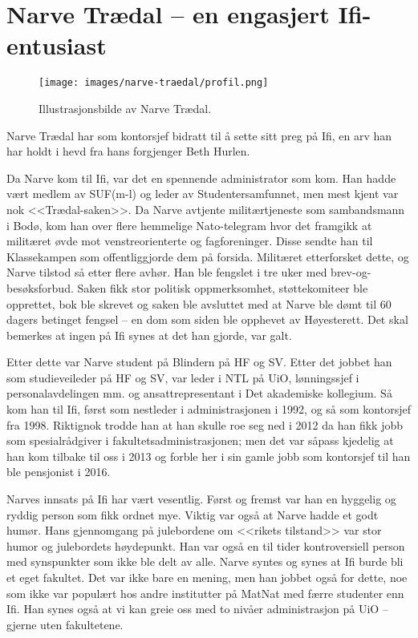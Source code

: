 \chapter[Narve Trædal]{Narve Trædal -- en engasjert Ifi-entusiast}

\author{Skrevet av Dag Langmyhr og Arne Maus}

\begin{wrapfigure}{r}{5cm}
	\centering
	\texttt{[image: images/narve-traedal/profil.png]}
	\label{fig:narve-traedal}
	\caption{Illustrasjonsbilde av Narve Trædal.}
\end{wrapfigure}

Narve Trædal har som kontorsjef bidratt til å sette sitt preg på Ifi, en arv han har holdt i hevd fra hans forgjenger Beth Hurlen.

Da Narve kom til Ifi, var det en spennende administrator som kom. Han hadde vært medlem av SUF(m-l) og leder av Studentersamfunnet, men mest kjent var nok <<Trædal-saken>>. Da Narve avtjente militærtjeneste som sambandsmann i Bodø, kom han over flere hemmelige Nato-telegram hvor det framgikk at militæret øvde mot venstreorienterte og fagforeninger. Disse sendte han til Klassekampen som offentliggjorde dem på forsida. Militæret etterforsket dette, og Narve tilstod så etter flere avhør. Han ble fengslet i tre uker med brev-og-besøksforbud. Saken fikk stor politisk oppmerksomhet, støttekomiteer ble opprettet, bok ble skrevet og saken ble avsluttet med at Narve ble dømt til 60 dagers betinget fengsel – en dom som siden ble opphevet av Høyesterett. Det skal bemerkes at ingen på Ifi synes at det han gjorde, var galt.

Etter dette var Narve student på Blindern på HF og SV. Etter det jobbet han som studieveileder på HF og SV, var leder i NTL på UiO, lønningssjef i personalavdelingen mm. og ansattrepresentant i Det akademiske kollegium. Så kom han til Ifi, først som nestleder i administrasjonen i 1992, og så som kontorsjef fra 1998. Riktignok trodde han at han skulle roe seg ned i 2012 da han fikk jobb som spesialrådgiver i fakultetsadministrasjonen; men det var såpass kjedelig at han kom tilbake til oss i 2013 og forble her i sin gamle jobb som kontorsjef til han ble pensjonist i 2016.

Narves innsats på Ifi har vært vesentlig. Først og fremst var han en hyggelig og ryddig person som fikk ordnet mye. Viktig var også at Narve hadde et godt humør. Hans gjennomgang på julebordene om <<rikets tilstand>> var stor humor og julebordets høydepunkt. Han var også en til tider kontroversiell person med synspunkter som ikke ble delt av alle. Narve syntes og synes at Ifi burde bli et eget fakultet. Det var ikke bare en mening, men han jobbet også for dette, noe som ikke var populært hos andre institutter på MatNat med færre studenter enn Ifi. Han synes også at vi kan greie oss med to nivåer administrasjon på UiO – gjerne uten fakultetene.


